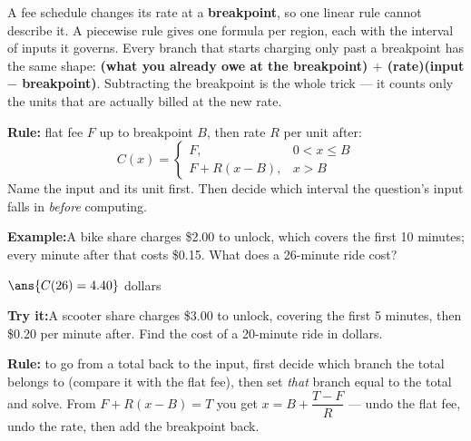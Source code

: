 \documentclass[12pt]{article}
\begin{document}

\noindent\small A fee schedule changes its rate at a \textbf{breakpoint}, so one
linear rule cannot describe it. A piecewise rule gives one formula per region,
each with the interval of inputs it governs. Every branch that starts charging
only past a breakpoint has the same shape:
\textbf{(what you already owe at the breakpoint) $+$ (rate)(input $-$ breakpoint)}.
Subtracting the breakpoint is the whole trick --- it counts only the units that
are actually billed at the new rate.\normalsize


\begin{formulabox}
\textbf{Rule:} flat fee $F$ up to breakpoint $B$, then rate $R$ per unit after:
\[
C(x) = \begin{cases} F, & 0 < x \le B \\[2pt] F + R(x - B), & x > B \end{cases}
\]
Name the input and its unit first. Then decide which interval the question's
input falls in \emph{before} computing.
\end{formulabox}

\begin{examplebox}
\textbf{Example:}\quad A bike share charges \$2.00 to unlock, which covers the
first 10 minutes; every minute after that costs \$0.15. What does a 26-minute
ride cost?

$\ans{C(26) = 4.40}$ dollars
\end{examplebox}

\begin{tryitbox}
\textbf{Try it:}\quad A scooter share charges \$3.00 to unlock, covering the
first 5 minutes, then \$0.20 per minute after. Find the cost of a 20-minute
ride in dollars.\\[2pt]
\end{tryitbox}


\begin{formulabox}
\textbf{Rule:} to go from a total back to the input, first decide which branch
the total belongs to (compare it with the flat fee), then set \emph{that}
branch equal to the total and solve. From $F + R(x - B) = T$ you get
$x = B + \dfrac{T - F}{R}$ --- undo the flat fee, undo the rate, then add the
breakpoint back.
\end{formulabox}
\end{document}

